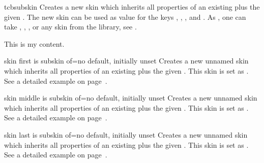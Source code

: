 \begin{docCommand}{tcbsubskin}{}
  Creates a new skin  which inherits all properties of an
  existing  plus the given .
  The new skin  can be used as value for the keys
  ,
  ,
  , and
  .
  As , one can take , ,
  , or any skin from the  library,
  see .

\begin{dispExample}

\begin{tcolorbox}[skin=mycross]
  This is my content.
\end{tcolorbox}
\end{dispExample}

\end{docCommand}


\begin{docTcbKey}{skin first is subskin of}{=}{no default, initially unset}
  Creates a new unnamed skin which inherits all properties of an
  existing  plus the given .
  This skin is set as .\\
  See a detailed example on page~\pageref{freeboxexample}.
\end{docTcbKey}


\begin{docTcbKey}{skin middle is subskin of}{=}{no default, initially unset}
  Creates a new unnamed skin which inherits all properties of an
  existing  plus the given .
  This skin is set as .\\
  See a detailed example on page~\pageref{freeboxexample}.
\end{docTcbKey}


\begin{docTcbKey}{skin last is subskin of}{=}{no default, initially unset}
  Creates a new unnamed skin which inherits all properties of an
  existing  plus the given .
  This skin is set as .\\
  See a detailed example on page~\pageref{freeboxexample}.
\end{docTcbKey}


